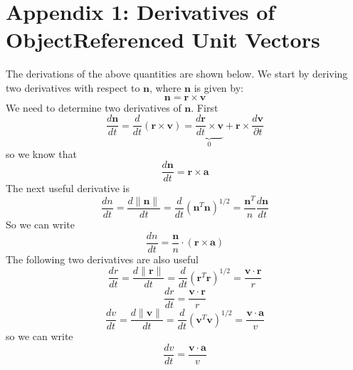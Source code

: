 {\section{Appendix 1: Derivatives of ObjectReferenced Unit Vectors}

The derivations of the above quantities are shown below.  We start
by deriving two derivatives with respect to $\mathbf{n}$, where
$\mathbf{n}$ is given by:
\begin{equation}
    \mathbf{n} =
    \mathbf{r}\times\mathbf{v}
\end{equation}
%
We need to determine two derivatives of $\mathbf{n}$. First
%
\begin{equation}
    \frac{d \mathbf{n}}{dt} = \frac{d }{d
    t}\left(\mathbf{r}\times\mathbf{v}\right) =
    \underbrace{\frac{d \mathbf{r}}{d t} \times\mathbf{v}}_0 +  \mathbf{r} \times
    \frac{d\mathbf{v}}{\partial t}
\end{equation}
%
so we know that
%
\begin{equation}
    \boxed{\frac{d \mathbf{n}}{dt} =   \mathbf{r} \times
    \mathbf{a}}
\end{equation}
%
The next useful derivative is
%
\begin{equation}
    \frac{dn}{dt} = \frac{d  \| \mathbf{n} \|}{dt} = \frac{d }{
    d
    t}\left( \mathbf{n}^T \mathbf{n} \right)^{1/2} =
    \frac{\mathbf{n}^T}{n}\frac{d \mathbf{n}}{dt}
\end{equation}
%
So we can write
%
\begin{equation}
    \boxed{\frac{dn}{dt} =
    \frac{\mathbf{n}}{n}\cdot\left(\mathbf{r}\times\mathbf{a}\right)}
\end{equation}
%
The following two derivatives are also useful
\begin{equation}
    \frac{dr}{dt} = \frac{d  \| \mathbf{r} \|}{dt} =
    \frac{d}{dt}(\mathbf{r}^T\mathbf{r})^{1/2} = \frac{\mathbf{v}  \cdot \mathbf{r} }{r}
\end{equation}
%
\begin{equation}
     \boxed{\frac{dr}{dt} = \frac{\mathbf{v}  \cdot \mathbf{r}
     }{r}}
\end{equation}
%
\begin{equation}
     \frac{dv}{dt} = \frac{d \| \mathbf{v} \|}{dt} = \frac{d}{dt}(\mathbf{v}^T\mathbf{v})^{1/2} = \frac{\mathbf{v}  \cdot \mathbf{a} }{v}
\end{equation}
%
so we can write
\begin{equation}
     \boxed{\frac{dv}{dt} = \frac{\mathbf{v}  \cdot \mathbf{a}
     }{v}}
\end{equation}

}
